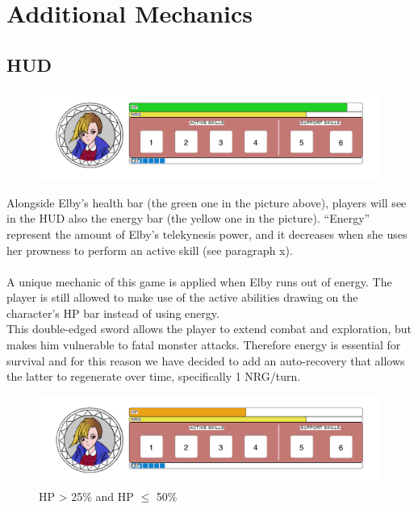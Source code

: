 \section{Additional Mechanics}

\subsection{HUD}

\begin{figure}[H]
	\centering
	\includegraphics[width=14cm]{images/hud/HUD_life_green.png}
\end{figure}

Alongside Elby's health bar (the green one in the picture above), players will see in the HUD also the energy bar (the yellow one in the picture). “Energy” represent the amount of Elby’s telekynesis power, and it decreases when she uses her prowness to perform an active skill (see paragraph x).\\\\
A unique mechanic of this game is applied when Elby runs out of energy. The player is still allowed to make use of the active abilities drawing on the character's HP bar instead of using energy.\\
This double-edged sword allows the player to extend combat and exploration, but makes him vulnerable to fatal monster attacks.
Therefore energy is essential for survival and for this reason we have decided to add an auto-recovery that allows the latter to regenerate over time, specifically 1 NRG/turn.



\begin{figure}[H]
	\centering
	\includegraphics[width=14cm]{images/hud/HUD_life_orange.png}
	\caption*{HP > 25\% and HP $\leq$ 50\%}
\end{figure}

